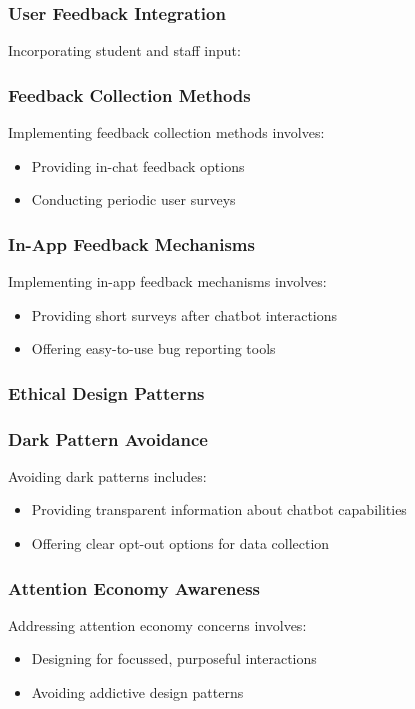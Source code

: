 \documentclass[14pt,a4paper]{article}
\begin{document}
\begin{multicols}{2}
\subsubsection{User Feedback Integration}
Incorporating student and staff input:

\subsubsection*{Feedback Collection Methods}
Implementing feedback collection methods \textit{\parencite[pp. 100-50]{TullisAlbert2024}} involves:
\begin{itemize}
    \item Providing in-chat feedback options
    \item Conducting periodic user surveys
\end{itemize}

\subsubsection*{In-App Feedback Mechanisms}
Implementing in-app feedback mechanisms \textit{\parencite[pp. 100-150]{TullisAlbert2024}} involves:
\begin{itemize}
    \item Providing short surveys after chatbot interactions
    \item Offering easy-to-use bug reporting tools
\end{itemize}

\subsubsection{Ethical Design Patterns}
\subsubsection{Dark Pattern Avoidance}
Avoiding dark patterns \textit{\parencite{Brignull2023}} includes:
\begin{itemize}
    \item Providing transparent information about chatbot capabilities
    \item Offering clear opt-out options for data collection
\end{itemize}


\subsubsection{Attention Economy Awareness}
Addressing attention economy concerns \textit{\parencite[pp. 10-30]{Williams2024}} involves:
\begin{itemize}
    \item Designing for focussed, purposeful interactions
    \item Avoiding addictive design patterns
\end{itemize}




\end{multicols}
\end{document}
